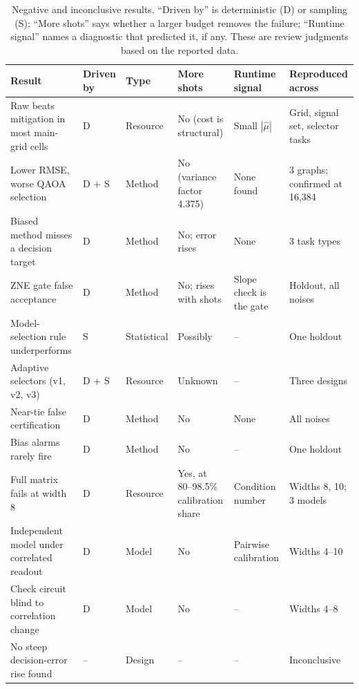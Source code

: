 \documentclass[10pt,twocolumn]{article}
\begin{document}
\begin{table}[t]
\centering
\caption{Negative and inconclusive results. ``Driven by'' is deterministic (D) or sampling (S); ``More
shots'' says whether a larger budget removes the failure; ``Runtime signal'' names a diagnostic that
predicted it, if any. These are review judgments based on the reported data.}
\label{tab:negative}
\footnotesize
\setlength{\tabcolsep}{4pt}
\begin{tabular}{@{}p{}lp{}p{}p{}p{}@{}}
\toprule
Result & Driven by & Type & More shots & Runtime signal & Reproduced across\\
\midrule
Raw beats mitigation in most main-grid cells & D & Resource & No (cost is structural) & Small $|\widehat\mu|$ & Grid, signal set, selector tasks\\
Lower RMSE, worse QAOA selection & D + S & Method & No (variance factor 4.375) & None found & 3 graphs; confirmed at 16,384\\
Biased method misses a decision target & D & Method & No; error rises & None & 3 task types\\
ZNE gate false acceptance & D & Method & No; rises with shots & Slope check is the gate & Holdout, all noises\\
Model-selection rule underperforms & S & Statistical & Possibly & -- & One holdout\\
Adaptive selectors (v1, v2, v3) & D + S & Resource & Unknown & -- & Three designs\\
Near-tie false certification & D & Method & No & None & All noises\\
Bias alarms rarely fire & D & Method & No & -- & One holdout\\
Full matrix fails at width 8 & D & Resource & Yes, at 80--98.5\% calibration share & Condition number & Widths 8, 10; 3 models\\
Independent model under correlated readout & D & Model & No & Pairwise calibration & Widths 4--10\\
Check circuit blind to correlation change & D & Model & No & -- & Widths 4--8\\
No steep decision-error rise found & -- & Design & -- & -- & Inconclusive\\
\bottomrule
\end{tabular}
\end{table}
\end{document}
